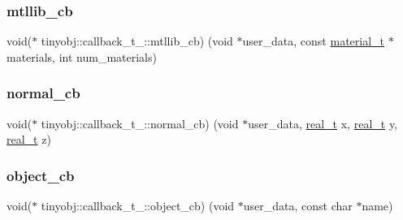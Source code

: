 \mbox{\label{structtinyobj_1_1callback__t___ac9002031da7d0ae5e035e6ccfbb5fb0e}} 
\subsubsection{\texorpdfstring{mtllib\+\_\+cb}{mtllib\_cb}}
{\footnotesize\ttfamily void($\ast$ tinyobj\+::callback\+\_\+t\+\_\+\+::mtllib\+\_\+cb) (void $\ast$user\+\_\+data, const \hyperlink{structtinyobj_1_1material__t}{material\+\_\+t} $\ast$materials, int num\+\_\+materials)}

\mbox{\label{structtinyobj_1_1callback__t___a0edd10bf4b39720520c8cfa24476ffe1}} 
\subsubsection{\texorpdfstring{normal\+\_\+cb}{normal\_cb}}
{\footnotesize\ttfamily void($\ast$ tinyobj\+::callback\+\_\+t\+\_\+\+::normal\+\_\+cb) (void $\ast$user\+\_\+data, \hyperlink{namespacetinyobj_ad5ca7469ff56bf0d8423120cfd99adce}{real\+\_\+t} x, \hyperlink{namespacetinyobj_ad5ca7469ff56bf0d8423120cfd99adce}{real\+\_\+t} y, \hyperlink{namespacetinyobj_ad5ca7469ff56bf0d8423120cfd99adce}{real\+\_\+t} z)}

\mbox{\label{structtinyobj_1_1callback__t___ad91a780d704c9d7ed9f858f42f33c78d}} 
\subsubsection{\texorpdfstring{object\+\_\+cb}{object\_cb}}
{\footnotesize\ttfamily void($\ast$ tinyobj\+::callback\+\_\+t\+\_\+\+::object\+\_\+cb) (void $\ast$user\+\_\+data, const char $\ast$name)}

